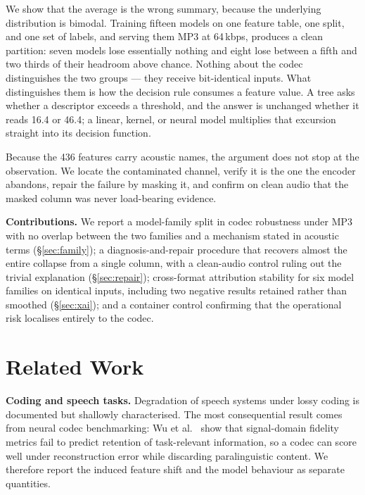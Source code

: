 \documentclass[a4paper,9pt,twocolumn]{extarticle}
\begin{document}
We show that the average is the wrong summary, because the underlying
distribution is bimodal. Training fifteen models on one feature table, one
split, and one set of labels, and serving them MP3 at 64\,kbps, produces a
clean partition: seven models lose essentially nothing and eight lose between
a fifth and two thirds of their headroom above chance. Nothing about the codec
distinguishes the two groups --- they receive bit-identical inputs. What
distinguishes them is how the decision rule consumes a feature value. A tree
asks whether a descriptor exceeds a threshold, and the answer is unchanged
whether it reads 16.4 or 46.4; a linear, kernel, or neural model multiplies
that excursion straight into its decision function.

Because the 436 features carry acoustic names, the argument does not stop at
the observation. We locate the contaminated channel, verify it is the one the
encoder abandons, repair the failure by masking it, and confirm on clean audio
that the masked column was never load-bearing evidence.

\medskip\noindent\textbf{Contributions.} We report a model-family split in
codec robustness under MP3 with no overlap between the two families and a
mechanism stated in acoustic terms (\S\ref{sec:family}); a diagnosis-and-repair
procedure that recovers almost the entire collapse from a single column, with a
clean-audio control ruling out the trivial explanation (\S\ref{sec:repair});
cross-format attribution stability for six model families on identical inputs,
including two negative results retained rather than smoothed
(\S\ref{sec:xai}); and a container control confirming that the operational risk
localises entirely to the codec.

\section{Related Work}
\textbf{Coding and speech tasks.} Degradation of speech systems under lossy
coding is documented but shallowly characterised. The most consequential result
comes from neural codec benchmarking: Wu et al.~\cite{wu2024codecsuperb} show
that signal-domain fidelity metrics fail to predict retention of task-relevant
information, so a codec can score well under reconstruction error while
discarding paralinguistic content. We therefore report the induced feature
shift and the model behaviour as separate quantities.
\end{document}
